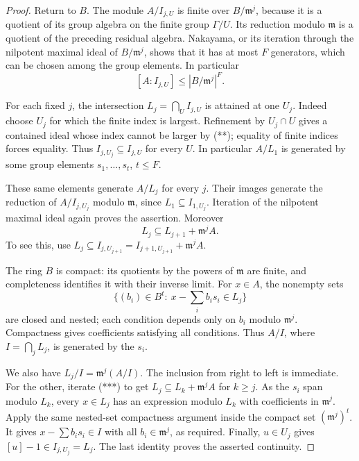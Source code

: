\begin{proof}
Return to \(B\).
The module \(A/I_{j,U}\) is finite over \(B/\mathfrak m^j\),
because it is a quotient of its group algebra on the finite group
\(\Gamma/U\).
Its reduction modulo \(\mathfrak m\) is a quotient of the preceding
residual algebra. Nakayama, or its iteration through the nilpotent
maximal ideal of \(B/\mathfrak m^j\), shows that it has at most \(F\)
generators, which can be chosen among the group elements.
In particular
\[
                  [A:I_{j,U}]\le |B/\mathfrak m^j|^F .
 \tag{**}
\]

For each fixed \(j\), the intersection
\(L_j=\bigcap_U I_{j,U}\) is attained at one \(U_j\).
Indeed choose \(U_j\) for which the finite index is largest.
Refinement by \(U_j\cap U\) gives a contained ideal whose index
cannot be larger by (**); equality of finite indices forces equality.
Thus \(I_{j,U_j}\subseteq I_{j,U}\) for every \(U\).
In particular \(A/L_1\) is generated by some group elements
\(s_1,\ldots,s_t\), \(t\le F\).

These same elements generate \(A/L_j\) for every \(j\).
Their images generate the reduction of \(A/I_{j,U_j}\) modulo
\(\mathfrak m\), since \(L_1\subseteq I_{1,U_j}\).
Iteration of the nilpotent maximal ideal again proves the assertion.
Moreover
\[
                  L_j\subseteq L_{j+1}+\mathfrak m^j A .
 \tag{***}
\]
To see this, use
\(L_j\subseteq I_{j,U_{j+1}}
 =I_{j+1,U_{j+1}}+\mathfrak m^jA\).

The ring \(B\) is compact: its quotients by the powers of
\(\mathfrak m\) are finite, and completeness identifies it with their
inverse limit.
For \(x\in A\), the nonempty sets
\[
 \{(b_i)\in B^t:\ x-\textstyle\sum_i b_is_i\in L_j\}
\]
are closed and nested; each condition depends only on \(b_i\)
modulo \(\mathfrak m^j\).
Compactness gives coefficients satisfying all conditions.
Thus \(A/I\), where \(I=\bigcap_j L_j\), is generated by the \(s_i\).

We also have \(L_j/I=\mathfrak m^j(A/I)\).
The inclusion from right to left is immediate.
For the other, iterate (***) to get
\(L_j\subseteq L_k+\mathfrak m^jA\) for \(k\ge j\).
As the \(s_i\) span modulo \(L_k\), every \(x\in L_j\) has an
expression modulo \(L_k\) with coefficients in \(\mathfrak m^j\).
Apply the same nested-set compactness argument inside the compact
set \((\mathfrak m^j)^t\).
It gives \(x-\sum b_i s_i\in I\) with all \(b_i\in\mathfrak m^j\),
as required.
Finally, \(u\in U_j\) gives \([u]-1\in I_{j,U_j}=L_j\).
The last identity proves the asserted continuity.
\end{proof}

